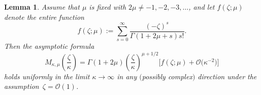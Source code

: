 \documentclass[11pt]{article}
\numberwithin{equation}{section}
\numberwithin{equation}{section}
\newtheorem{Lemma}[Theorem]{Lemma}
\begin{document}
\begin{Lemma}\label{lem:M-expansion}
Assume that $\mu$ is fixed with $2\mu\neq -1,-2,-3,\dots$, and let $f(\zeta;\mu)$ denote the entire function
\begin{equation}
 f(\zeta;\mu):=\sum_{s=0}^\infty \frac{(-\zeta)^s}{\Gamma(1+2\mu+s)s!}.
\label{eq:Bessel-f-define}
\end{equation}
Then the asymptotic formula
\begin{equation*}%
 M_{\kappa,\mu}\left(\frac{\zeta}{\kappa}\right) = \Gamma(1+2\mu)\left(\frac{\zeta}{\kappa}\right)^{\mu+1/2}\big[f(\zeta;\mu) + \mathcal{O}\big(\kappa^{-2}\big)\big]
\end{equation*}
holds uniformly in the limit $\kappa\to\infty$ in any $($possibly complex$)$ direction under the assumption~${\zeta=\mathcal{O}(1)}$.
\end{Lemma}
\end{document}

